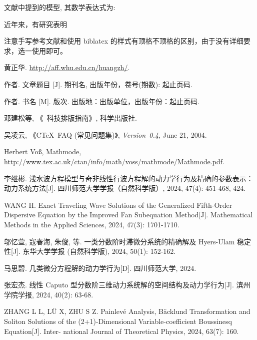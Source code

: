 \documentclass[forprint]{gdufe_master_thesis}
\begin{document}
文献中提到的模型, 其数学表达式为:

近年来，有研究表明

注意手写参考文献和使用 biblatex 的样式有顶格不顶格的区别，由于没有详细要求，选一使用即可。
\cleardoublepage{}
\pagestyle{master-frontandbackmatter}
\begin{thebibliography}{00}
    黄正华. \url{http://aff.whu.edu.cn/huangzh/}.

     作者. 文章题目 [J].  期刊名, 出版年份，卷号(期数): 起止页码.

     作者. 书名 [M]. 版次. 出版地：出版单位，出版年份：起止页码.

     邓建松等, 《\LaTeXe~科技排版指南》, 科学出版社.

     吴凌云, 《CTeX~FAQ (常见问题集)》, \textit{Version~0.4}, June 21, 2004.

     Herbert Vo\ss, Mathmode, \url{http://www.tex.ac.uk/ctan/info/math/voss/mathmode/Mathmode.pdf}.

     李继彬. 浅水波方程模型与奇非线性行波方程解的动力学行为及精确的参数表示：动力系统方法[J]. 四川师范大学学报（自然科学版）, 2024, 47(4): 451-468, 424.

     WANG H. Exact Traveling Wave Solutions of the Generalized Fifth-Order Dispersive
    Equation by the Improved Fan Subequation Method[J]. Mathematical Methods in the
    Applied Sciences, 2024, 47(3): 1701-1710.

     邬忆萱, 寇春海, 朱俊, 等. 一类分数阶时滞微分系统的精确解及 Hyers-Ulam 稳定
    性[J]. 东华大学学报 (自然科学版), 2024, 50(1): 152-162.

     马思碧. 几类微分方程解的动力学行为[D]. 四川师范大学, 2024.

     张宏杰. 线性 Caputo 型分数阶三维动力系统解的空间结构及动力学行为[J]. 滨州学院学报, 2024, 40(2): 63-68.

     ZHANG L L, LÜ X, ZHU S Z. Painlevé Analysis, Bäcklund Transformation and Soliton
    Solutions of the (2+1)-Dimensional Variable-coefficient Boussinesq Equation[J]. Inter-
    national Journal of Theoretical Physics, 2024, 63(7): 160.
\end{thebibliography}
\end{document}
